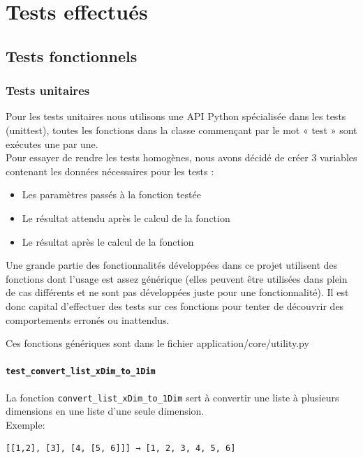 \documentclass[16pts]{report}
\begin{document}
\chapter{Tests effectués}
\label{cha:Tests}
    \section{Tests fonctionnels}
    \label{sec:Tests fonctionnels}
\subsection{Tests unitaires}

Pour les tests unitaires nous utilisons une API Python spécialisée dans les
tests (unittest), toutes les fonctions dans la classe commençant par le mot «
test » sont exécutes une par une.\\

Pour essayer de rendre les tests homogènes, nous avons décidé de créer 3
variables contenant les données nécessaires pour les tests :\\

\begin{itemize}
    \item Les paramètres passés à la fonction testée
    \item Le résultat attendu après le calcul de la fonction
    \item Le résultat après le calcul de la fonction
\end{itemize}

Une grande partie des fonctionnalités développées dans ce projet utilisent
des fonctions dont l'usage est assez générique (elles peuvent être utilisées
dans plein de cas différents et ne sont pas développées juste pour une
fonctionnalité). Il est donc capital d'effectuer des tests sur ces fonctions
pour tenter de découvrir des comportements erronés ou inattendus.

Ces fonctions génériques sont dans le fichier application/core/utility.py

\subsubsection{\texttt{test\_convert\_list\_xDim\_to\_1Dim}}
La fonction \verb|convert_list_xDim_to_1Dim| sert à convertir une liste à
plusieurs dimensions en une liste d'une seule dimension.
\\
Exemple:
\begin{verbatim}
[[1,2], [3], [4, [5, 6]]] → [1, 2, 3, 4, 5, 6]
\end{verbatim}
\end{document}
